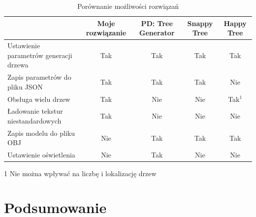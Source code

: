 \documentclass[a4paper,12pt,twoside]{book} %
\begin{document}
\begin{table}[H]
	\caption{Porównanie możliwości rozwiązań}
	\label{tab:compareTable}
	\small
	\setlength\tabcolsep{2pt}
	\centering
	\begin{center}
		\begin{tabular}{|p{4cm}|c|c|c|c| }
			\hline
			& Moje rozwiązanie & PD: Tree Generator & Snappy Tree & Happy Tree \\ [0.5ex]
			\hline
			Ustawienie parametrów generacji drzewa & Tak & Tak & Tak & Tak \\ [0.5ex]
			\hline
			Zapis parametrów do pliku JSON & Tak & Tak & Tak & Nie \\ [0.5ex]
			\hline
			Obsługa wielu drzew & Tak & Nie & Nie & Tak$^1$ \\ [0.5ex]
			\hline
			Ładowanie tekstur niestandardowych & Tak & Nie & Nie & Nie \\ [0.5ex]
			\hline
			Zapis modelu do pliku OBJ & Nie & Tak & Tak & Tak \\ [0.5ex]
			\hline
			Ustawienie oświetlenia & Nie & Tak & Nie & Nie \\ [0.5ex]
			\hline
		\end{tabular}
		\begin{tablenotes}
			\small
			\item 1 Nie można wpływać na liczbę i lokalizację drzew
		  \end{tablenotes}
	\end{center}
\end{table}

\chapter{Podsumowanie}




\end{document}
